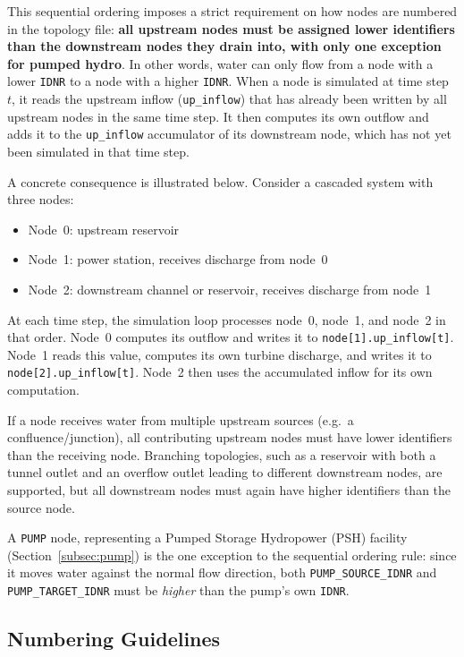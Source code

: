 \documentclass[a4paper, 12pt]{report}
\begin{document}
	This sequential ordering imposes a strict requirement on how nodes are numbered in the topology file: \textbf{all upstream nodes must be assigned lower identifiers than the downstream nodes they drain into, with only one exception for pumped hydro}. In other words, water can only flow from a node with a lower \texttt{IDNR} to a node with a higher \texttt{IDNR}. When a node is simulated at time step~$t$, it reads the upstream inflow (\texttt{up\_inflow}) that has already been written by all upstream nodes in the same time step. It then computes its own outflow and adds it to the \texttt{up\_inflow} accumulator of its downstream node, which has not yet been simulated in that time step.
	
	A concrete consequence is illustrated below. Consider a cascaded system with three nodes:
	
	\begin{itemize}
		\item Node~0: upstream reservoir
		\item Node~1: power station, receives discharge from node~0
		\item Node~2: downstream channel or reservoir, receives discharge from node~1
	\end{itemize}
	
	At each time step, the simulation loop processes node~0, node~1, and node~2 in that order. Node~0 computes its outflow and writes it to \texttt{node[1].up\_inflow[t]}. Node~1 reads this value, computes its own turbine discharge, and writes it to \texttt{node[2].up\_inflow[t]}. Node~2 then uses the accumulated inflow for its own computation.

	
	If a node receives water from multiple upstream sources (e.g.\ a confluence/junction), all contributing upstream nodes must have lower identifiers than the receiving node. Branching topologies, such as a reservoir with both a tunnel outlet and an overflow outlet leading to different downstream nodes, are supported, but all downstream nodes must again have higher identifiers than the source node.
	
	A \texttt{PUMP} node, representing a Pumped Storage Hydropower (PSH) facility (Section~\ref{subsec:pump}) is the one exception to the sequential ordering rule: since it moves water against the normal flow direction, both \texttt{PUMP\_SOURCE\_IDNR} and \texttt{PUMP\_TARGET\_IDNR} must be \emph{higher} than the pump's own \texttt{IDNR}.
	
	\subsection*{Numbering Guidelines}
	
\end{document}
